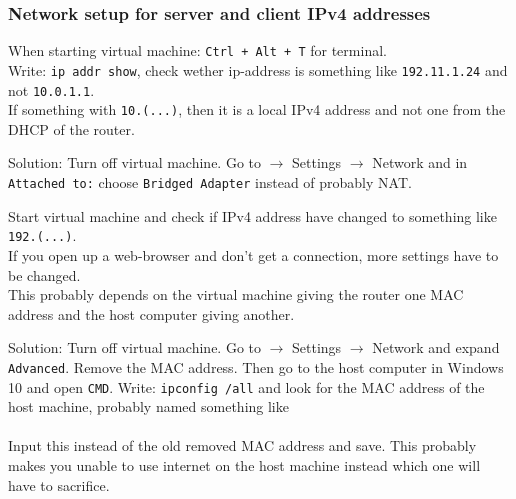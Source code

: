 \subsubsection{Network setup for server and client IPv4 addresses}

When starting virtual machine: \texttt{Ctrl + Alt + T} for terminal.\\
Write: \texttt{ip addr show}, check wether ip-address is something like \texttt{192.11.1.24} and not \texttt{10.0.1.1}.\\
If something with \texttt{10.(...)}, then it is a local IPv4 address and not one from the DHCP of the router. 

Solution: Turn off virtual machine. Go to \(\rightarrow\) Settings \(\rightarrow\) Network and in \texttt{Attached to:} choose \texttt{Bridged Adapter} instead of probably NAT.

Start virtual machine and check if IPv4 address have changed to something like \texttt{192.(...)}.\\
If you open up a web-browser and don't get a connection, more settings have to be changed.\\
This probably depends on the virtual machine giving the router one MAC address and the host computer giving another.

Solution: Turn off virtual machine. Go to \(\rightarrow\) Settings \(\rightarrow\) Network and expand \texttt{Advanced}. Remove the MAC address. Then go to the host computer in Windows 10 and open \texttt{CMD}. Write: \texttt{ipconfig /all} and look for the MAC address of the host machine, probably named something like \\\\
Input this instead of the old removed MAC address and save. This probably makes you unable to use internet on the host machine instead which one will have to sacrifice.


